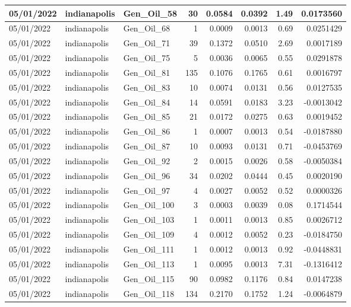 \documentclass[
  letterpaper,
  DIV=11,
  numbers=noendperiod]{scrartcl}
\begin{document}
\begin{tabular}{l|l|l|r|r|r|r|r}
\hline
05/01/2022 & indianapolis & Gen\_Oil\_58 & 30 & 0.0584 & 0.0392 & 1.49 & 0.0173560\\
\hline
05/01/2022 & indianapolis & Gen\_Oil\_68 & 1 & 0.0009 & 0.0013 & 0.69 & 0.0251429\\
\hline
05/01/2022 & indianapolis & Gen\_Oil\_71 & 39 & 0.1372 & 0.0510 & 2.69 & 0.0017189\\
\hline
05/01/2022 & indianapolis & Gen\_Oil\_75 & 5 & 0.0036 & 0.0065 & 0.55 & 0.0291878\\
\hline
05/01/2022 & indianapolis & Gen\_Oil\_81 & 135 & 0.1076 & 0.1765 & 0.61 & 0.0016797\\
\hline
05/01/2022 & indianapolis & Gen\_Oil\_83 & 10 & 0.0074 & 0.0131 & 0.56 & 0.0127535\\
\hline
05/01/2022 & indianapolis & Gen\_Oil\_84 & 14 & 0.0591 & 0.0183 & 3.23 & -0.0013042\\
\hline
05/01/2022 & indianapolis & Gen\_Oil\_85 & 21 & 0.0172 & 0.0275 & 0.63 & 0.0019452\\
\hline
05/01/2022 & indianapolis & Gen\_Oil\_86 & 1 & 0.0007 & 0.0013 & 0.54 & -0.0187880\\
\hline
05/01/2022 & indianapolis & Gen\_Oil\_87 & 10 & 0.0093 & 0.0131 & 0.71 & -0.0453769\\
\hline
05/01/2022 & indianapolis & Gen\_Oil\_92 & 2 & 0.0015 & 0.0026 & 0.58 & -0.0050384\\
\hline
05/01/2022 & indianapolis & Gen\_Oil\_96 & 34 & 0.0202 & 0.0444 & 0.45 & 0.0020190\\
\hline
05/01/2022 & indianapolis & Gen\_Oil\_97 & 4 & 0.0027 & 0.0052 & 0.52 & 0.0000326\\
\hline
05/01/2022 & indianapolis & Gen\_Oil\_100 & 3 & 0.0003 & 0.0039 & 0.08 & 0.1714544\\
\hline
05/01/2022 & indianapolis & Gen\_Oil\_103 & 1 & 0.0011 & 0.0013 & 0.85 & 0.0026712\\
\hline
05/01/2022 & indianapolis & Gen\_Oil\_109 & 4 & 0.0012 & 0.0052 & 0.23 & -0.0184750\\
\hline
05/01/2022 & indianapolis & Gen\_Oil\_111 & 1 & 0.0012 & 0.0013 & 0.92 & -0.0448831\\
\hline
05/01/2022 & indianapolis & Gen\_Oil\_113 & 1 & 0.0095 & 0.0013 & 7.31 & -0.1316412\\
\hline
05/01/2022 & indianapolis & Gen\_Oil\_115 & 90 & 0.0982 & 0.1176 & 0.84 & 0.0147238\\
\hline
05/01/2022 & indianapolis & Gen\_Oil\_118 & 134 & 0.2170 & 0.1752 & 1.24 & -0.0064879\\

\end{tabular}
\end{document}
